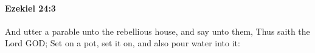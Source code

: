 
		\paragraph{Ezekiel 24:3} %
			\label{EZEKIEL-24-3}

			And utter a parable unto the rebellious house, and say unto them, Thus saith the Lord GOD; Set on a pot, set it on, and also pour water into it:


